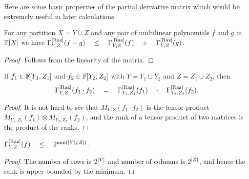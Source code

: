 

Here are some basic properties of the partial derivative matrix which would be extremely useful in later calculations.

\begin{observation}\label{obs:pdm-subadditivity}
	For any partition $X = Y \sqcup Z$ and any pair of multilinear 
	polynomials $f$ and $g$ in $\mathbb{F}[X]$ we have 
$\Gamma^{\mathrm{[Raz]}}_{Y,Z}(f+g) \quad \leq \quad \Gamma^{\mathrm{[Raz]}}_{Y,Z}(f) \quad + \quad \Gamma^{\mathrm{[Raz]}}_{Y,Z}(g)$.
\end{observation}
\begin{proof}
Follows from the linearity of the matrix. 
\end{proof}

\begin{observation}[Multiplicativity]\label{obs:pdm-multiplicativity}
If $f_1 \in \mathbb{F}[Y_1,Z_1]$ and $f_2 \in \mathbb{F}[Y_2, Z_2]$ with $Y = Y_1 \sqcup Y_2$ and $Z = Z_1 \sqcup Z_2$, then
$$
\Gamma^{\mathrm{[Raz]}}_{Y,Z}(f_1\cdot f_2) \quad = \quad \Gamma^{\mathrm{[Raz]}}_{Y_1, Z_1}(f_1) \quad \cdot \quad \Gamma^{\mathrm{[Raz]}}_{Y_2, Z_2}(f_2).
$$
\end{observation}
\begin{proof}
  It is not hard to see that $M_{Y,Z}(f_1\cdot f_2)$ is the tensor product $M_{Y_1, Z_1}(f_1) \otimes M_{Y_2, Z_2}(f_2)$, and the rank of a tensor product of two matrices is the product of the ranks.
\end{proof}

\begin{observation}\label{obs:pdm-upperbound}
  $\Gamma^{\mathrm{[Raz]}}_{Y,Z}(f) \quad \leq \quad 2^{\min(\left|Y\right|, \left|Z\right|)}$.
\end{observation}
\begin{proof}
  The number of rows is $2^{\left|Y\right|}$ and number of columns is $2^{\left|Z\right|}$, and hence the rank is upper-bounded by the minimum.
\end{proof}


